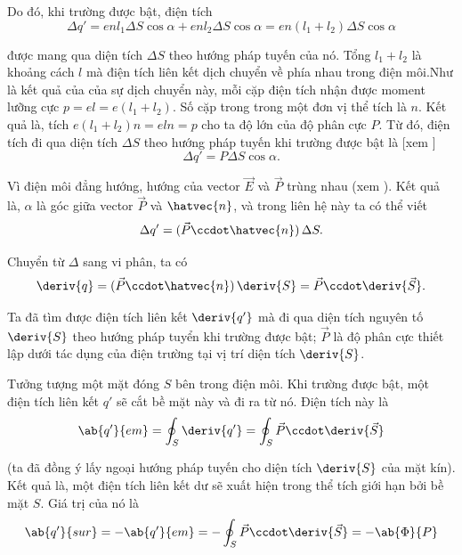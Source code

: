 Do đó, khi trường được bật, điện tích
\begin{equation*}
    \Delta{q}' = enl_1\Delta{S}\cos\alpha + enl_2\Delta{S}\cos\alpha = en (l_1+l_2) \Delta{S} \cos\alpha
\end{equation*}

\noindent
được mang qua diện tích $\Delta{S}$ theo hướng pháp tuyến của nó. Tổng $l_1+l_2$ là khoảng cách $l$ mà điện tích liên kết dịch chuyển về phía nhau trong điện môi.Như là kết quả của của sự dịch chuyển này, mỗi cặp điện tích nhận được moment lưỡng cực $p=el=e(l_1+l_2)$. Số cặp trong trong một đơn vị thể tích là $n$. Kết quả là, tích $e(l_1+l_2)n=eln=p$ cho ta độ lớn của độ phân cực $P$. Từ đó, điện tích đi qua diện tích $\Delta{S}$ theo hướng pháp tuyến khi trường được bật là [xem ]
\begin{equation*}
    \Delta{q}' = P \Delta{S} \cos\alpha.
\end{equation*}

Vì điện môi đẳng hướng, hướng của vector $\vec{E}$ và $\vec{P}$ trùng nhau (xem ). Kết quả là, $\alpha$ là góc giữa vector $\vec{P}$ và $\hatvec{n}$, và trong liên hệ này ta có thể viết
\begin{equation*}
    \Delta{q}' = (\vec{P} \ccdot \hatvec{n})\, \Delta{S}.
\end{equation*}

\noindent
Chuyển từ $\Delta$ sang vi phân, ta có
\begin{equation*}
    \deriv{q} = (\vec{P} \ccdot \hatvec{n})\, \deriv{S} = \vec{P} \ccdot \deriv{\vec{S}}.
\end{equation*}

Ta đã tìm được điện tích liên kết $\deriv{q'}$ mà đi qua diện tích nguyên tố $\deriv{S}$ theo hướng pháp tuyển khi trường được bật; $\vec{P}$ là độ phân cực thiết lập dưới tác dụng của điện trường tại vị trí diện tích $\deriv{S}$.

Tưởng tượng một mặt đóng $S$ bên trong điện môi. Khi trường được bật, một điện tích liên kết $q'$ sẽ cắt bề mặt này và đi ra từ nó. Điện tích này là
\begin{equation*}
    \ab{q'}{em} = \oint_S \deriv{q'} = \oint_S \vec{P} \ccdot \deriv{\vec{S}}
\end{equation*}

\noindent
(ta đã đồng ý lấy ngoại hướng pháp tuyến cho diện tích $\deriv{S}$ của mặt kín). Kết quả là, một điện tích liên kết dư sẽ xuất hiện trong thể tích giới hạn bởi bề mặt $S$. Giá trị của nó là
\begin{equation}\label{eq:2_11}
    \ab{q'}{sur} = - \ab{q'}{em} = - \oint_S \vec{P} \ccdot \deriv{\vec{S}} = - \ab{\Phi}{P}
\end{equation}

